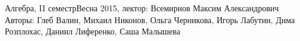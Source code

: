 


\BigHeader
	{Алгебра, II семестр}{Весна 2015, лектор: Всемирнов Максим Александрович}
	{Авторы: Глеб Валин, Михаил Никонов, Ольга Черникова, Игорь Лабутин, Дима Розплохас, Даниил Лиференко, Саша Малышева}
	
 











